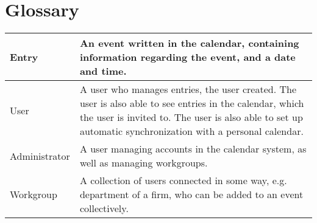 \section{Glossary}
\begin{center}
    \begin{tabular}{ | l | p{10cm} |}
    \hline
    Entry & An event written in the calendar, containing information regarding the event, and a date and time. \\ \hline
    User & A user who manages entries, the user created. The user is also able to see entries in the calendar, which the user is invited to. The user is also able to set up automatic synchronization with a personal calendar. \\ \hline
    Administrator & A user managing accounts in the calendar system, as well as managing workgroups. \\ \hline
	Workgroup & A collection of users connected in some way, e.g. department of a firm, who can be added to an event collectively. \\ \hline
    \end{tabular}
\end{center}